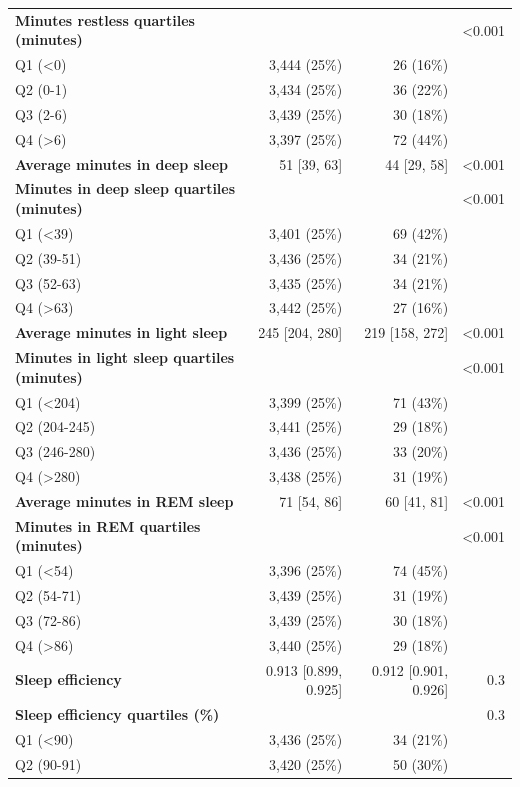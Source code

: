 \documentclass[11pt]{article}
\begin{document}
\begin{longtable}{@{}p{6.4cm}rrr@{}}
\textbf{Minutes restless quartiles (minutes)} &  &  & <0.001 \\
\quad Q1 (<0) & 3,444 (25\%) & 26 (16\%) &  \\
\quad Q2 (0-1) & 3,434 (25\%) & 36 (22\%) &  \\
\quad Q3 (2-6) & 3,439 (25\%) & 30 (18\%) &  \\
\quad Q4 (>6) & 3,397 (25\%) & 72 (44\%) &  \\
\textbf{Average minutes in deep sleep} & 51 [39, 63] & 44 [29, 58] & <0.001 \\
\textbf{Minutes in deep sleep quartiles (minutes)} &  &  & <0.001 \\
\quad Q1 (<39) & 3,401 (25\%) & 69 (42\%) &  \\
\quad Q2 (39-51) & 3,436 (25\%) & 34 (21\%) &  \\
\quad Q3 (52-63) & 3,435 (25\%) & 34 (21\%) &  \\
\quad Q4 (>63) & 3,442 (25\%) & 27 (16\%) &  \\
\textbf{Average minutes in light sleep} & 245 [204, 280] & 219 [158, 272] & <0.001 \\
\textbf{Minutes in light sleep quartiles (minutes)} &  &  & <0.001 \\
\quad Q1 (<204) & 3,399 (25\%) & 71 (43\%) &  \\
\quad Q2 (204-245) & 3,441 (25\%) & 29 (18\%) &  \\
\quad Q3 (246-280) & 3,436 (25\%) & 33 (20\%) &  \\
\quad Q4 (>280) & 3,438 (25\%) & 31 (19\%) &  \\
\textbf{Average minutes in REM sleep} & 71 [54, 86] & 60 [41, 81] & <0.001 \\
\textbf{Minutes in REM quartiles (minutes)} &  &  & <0.001 \\
\quad Q1 (<54) & 3,396 (25\%) & 74 (45\%) &  \\
\quad Q2 (54-71) & 3,439 (25\%) & 31 (19\%) &  \\
\quad Q3 (72-86) & 3,439 (25\%) & 30 (18\%) &  \\
\quad Q4 (>86) & 3,440 (25\%) & 29 (18\%) &  \\
\textbf{Sleep efficiency} & 0.913 [0.899, 0.925] & 0.912 [0.901, 0.926] & 0.3 \\
\textbf{Sleep efficiency quartiles (\%)} &  &  & 0.3 \\
\quad Q1 (<90) & 3,436 (25\%) & 34 (21\%) &  \\
\quad Q2 (90-91) & 3,420 (25\%) & 50 (30\%) &  \\

\end{longtable}
\end{document}
